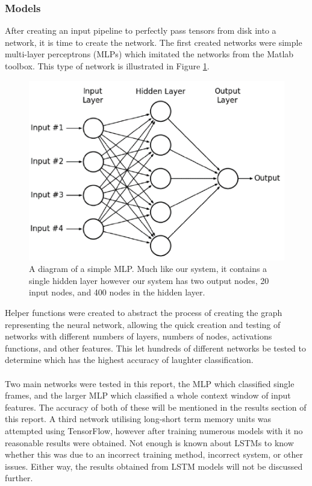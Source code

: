 \documentclass[a4paper,11pt,notitlepage]{article}
\begin{document}
\subsubsection{Models}


After creating an input pipeline to perfectly pass tensors from disk into a network, it is time to create the network. The first created networks were simple multi-layer perceptrons (MLPs) which imitated the networks from the Matlab toolbox. This type of network is illustrated in Figure \ref{mlp_example}.

\begin{figure}[H]
	\centering
	\vspace{0.5cm}
	\includegraphics[scale = 0.75]{figs/mlp.png}
	\caption{A diagram of a simple MLP. Much like our system, it contains a single hidden layer however our system has two output nodes, 20 input nodes, and 400 nodes in the hidden layer.}
	\label{mlp_example}
\end{figure}

Helper functions were created to abstract the process of creating the graph representing the neural network, allowing the quick creation and testing of networks with different numbers of layers, numbers of nodes, activations functions, and other features. This let hundreds of different networks be tested to determine which has the highest accuracy of laughter classification.\\
\\
Two main networks were tested in this report, the MLP which classified single frames, and the larger MLP which classified a whole context window of input features. The accuracy of both of these will be mentioned in the results section of this report. A third network utilising long-short term memory units was attempted using TensorFlow, however after training numerous models with it no reasonable results were obtained. Not enough is known about LSTMs to know whether this was due to an incorrect training method, incorrect system, or other issues. Either way, the results obtained from LSTM models will not be discussed further.
\end{document}
